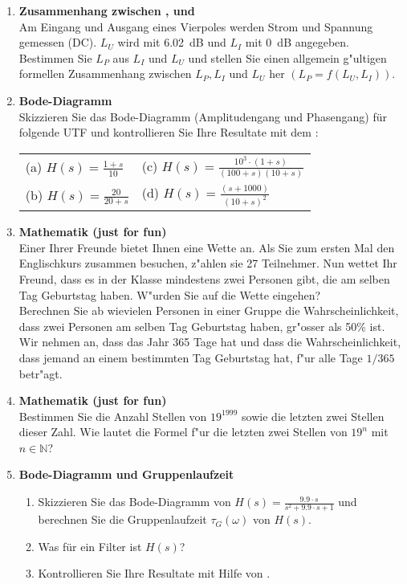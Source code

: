 {\begin{enumerate}
\item {\bf Zusammenhang zwischen ,  und }\\ Am Eingang
  und Ausgang eines Vierpoles werden Strom und Spannung gemessen (DC).
  $L_U$ wird mit 6.02~dB und $L_I$ mit 0~dB angegeben. Bestimmen Sie
  $L_P$ aus $L_I$ und $L_U$ und stellen Sie einen allgemein g"ultigen
  formellen Zusammenhang zwischen $L_P, L_I$ und $L_U$ her
  $(L_P=f(L_U,L_I))$.

\item{\bf Bode-Diagramm}\\ Skizzieren Sie das
  Bode-Diagramm (Amplitudengang und
  Phasengang) f\"ur folgende UTF und kontrollieren Sie Ihre Resultate mit dem :\\%
\begin{tabular}{l l}
 (a) $H(s)=\frac{1+s}{10} $ \hspace*{3.7cm}& (c) $H(s)=\frac{10^3\cdot (1+s)}{(100+s)(10+s)} $\\
 (b) $H(s)=\frac{20}{20+s} $ & (d) $H(s)=\frac{(s+1000)}{(10+s)^2} $\\
 
\end{tabular}
   
\item {\bf Mathematik (just for fun)}\\ Einer Ihrer Freunde bietet
  Ihnen eine Wette an. Als Sie zum ersten Mal den
  Englischkurs zusammen besuchen, z"ahlen sie 27 Teilnehmer. Nun
  wettet Ihr Freund, dass es in der Klasse mindestens zwei Personen
  gibt, die am selben Tag Geburtstag haben. W"urden Sie auf die
  Wette eingehen? \\ Berechnen Sie ab wievielen Personen in einer
  Gruppe die Wahrscheinlichkeit, dass zwei Personen am selben Tag
  Geburtstag haben, gr"osser als 50\% ist. Wir nehmen an, dass das
  Jahr 365 Tage hat und dass die Wahrscheinlichkeit, dass jemand an
  einem bestimmten Tag Geburtstag hat, f"ur alle Tage $1/365$
  betr"agt.  

\item {\bf Mathematik (just for fun)}\\ Bestimmen Sie die Anzahl
  Stellen von $19^{1999}$ sowie die letzten zwei Stellen dieser Zahl. Wie lautet
  die Formel f"ur die letzten zwei Stellen von $19^n$ mit $n \in
  \mathbb{N}$?

\item {\bf Bode-Diagramm und Gruppenlaufzeit \cite{FRE:BOS:04}}
\begin{enumerate}
\item{} Skizzieren Sie das Bode-Diagramm von $H(s)=\frac{9.9\cdot
    s}{s^2+9.9\cdot s +1}$ und berechnen Sie die Gruppenlaufzeit
  $\tau_G(\omega)$ von $H(s)$.
  \item{} Was f\"ur ein Filter ist $H(s)$?
  \item{} Kontrollieren Sie Ihre Resultate mit Hilfe von \matlogo.
\end{enumerate}
\newpage


\end{enumerate}}
